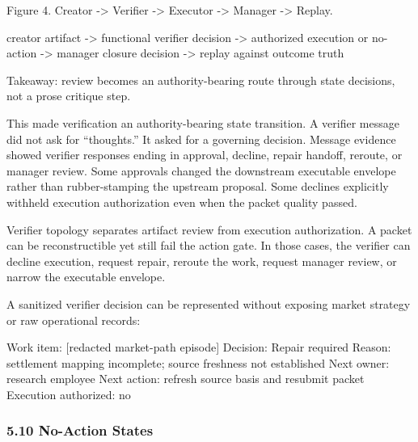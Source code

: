 \documentclass[
]{article}
\newenvironment{Shaded}{}{}
\newcommand{\NormalTok}[1]{#1}
\begin{document}
Figure 4. Creator -\textgreater{} Verifier -\textgreater{} Executor -\textgreater{} Manager -\textgreater{} Replay.

\begin{Shaded}
\begin{Highlighting}[]
\NormalTok{creator artifact}
\NormalTok{  {-}\textgreater{} functional verifier decision}
\NormalTok{  {-}\textgreater{} authorized execution or no{-}action}
\NormalTok{  {-}\textgreater{} manager closure decision}
\NormalTok{  {-}\textgreater{} replay against outcome truth}
\end{Highlighting}
\end{Shaded}

Takeaway: review becomes an authority-bearing route through state decisions, not a prose critique step.

This made verification an authority-bearing state transition. A verifier message did not ask for ``thoughts.'' It asked for a governing decision. Message evidence showed verifier responses ending in approval, decline, repair handoff, reroute, or manager review. Some approvals changed the downstream executable envelope rather than rubber-stamping the upstream proposal. Some declines explicitly withheld execution authorization even when the packet quality passed.

Verifier topology separates artifact review from execution authorization. A packet can be reconstructible yet still fail the action gate. In those cases, the verifier can decline execution, request repair, reroute the work, request manager review, or narrow the executable envelope.

A sanitized verifier decision can be represented without exposing market strategy or raw operational records:

\begin{Shaded}
\begin{Highlighting}[]
\NormalTok{Work item: [redacted market{-}path episode]}
\NormalTok{Decision: Repair required}
\NormalTok{Reason: settlement mapping incomplete; source freshness not established}
\NormalTok{Next owner: research employee}
\NormalTok{Next action: refresh source basis and resubmit packet}
\NormalTok{Execution authorized: no}
\end{Highlighting}
\end{Shaded}

\subsubsection{5.10 No-Action States}\label{no-action-states}
\end{document}
